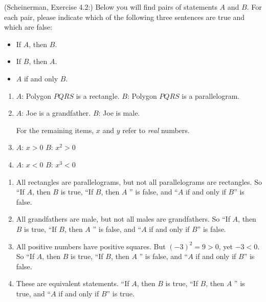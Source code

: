 \documentclass{article}
\theoremstyle{definition}
\begin{document}
\begin{question}
   (Scheinerman, Exercise 4.2:)
    Below you will find pairs of statements $A$ and $B$. For each pair, please indicate which
of the following three sentences are true and which are false:
    \begin{itemize}
        \item If $A$, then $B$.
        \item If $B$, then $A$.
        \item $A$ if and only $B$.
    \end{itemize}
    \begin{enumerate}
        \item $A$: Polygon $PQRS$ is a rectangle. 
              $B$: Polygon $PQRS$ is a parallelogram.
        \item $A$: Joe is a grandfather.
              $B$: Joe is male.

         For the remaining items, $x$ and $y$ refer to \emph{real} numbers.

         \item $A$: $x>0$
               $B$: $x^2>0$
         \item $A$: $x<0$
               $B$: $x^3<0$
               
    \end{enumerate}
\end{question}
\begin{solution}
    \begin{enumerate}
        \item All rectangles are parallelograms, but not all parallelograms are rectangles.
              So ``If $A$, then $B$ is true, ``If $B$, then $A$ '' is false, and ``$A$ if and only if $B$'' is false.
        \item All grandfathers are male, but not all males are grandfathers.
              So ``If $A$, then $B$ is true, ``If $B$, then $A$ '' is false, and ``$A$ if and only if $B$'' is false.   
                       \item All positive numbers have positive squares.  But $(-3)^2 = 9 > 0$, yet $-3 < 0$.
              So ``If $A$, then $B$ is true, ``If $B$, then $A$ '' is false, and ``$A$ if and only if $B$'' is false.
         \item These are equivalent statements.
              ``If $A$, then $B$ is true, ``If $B$, then $A$ '' is true, and ``$A$ if and only if $B$'' is true.   
       \end{enumerate}
\end{solution}
\end{document}
